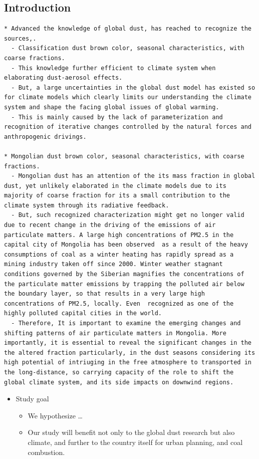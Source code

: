\documentclass[
  11pt,
]{article}
\providecommand{\tightlist}{%
  \setlength{\itemsep}{0pt}\setlength{\parskip}{0pt}}
\begin{document}
\subsection{Introduction}\label{introduction}

\begin{verbatim}
* Advanced the knowledge of global dust, has reached to recognize the sources,.
  - Classification dust brown color, seasonal characteristics, with coarse fractions.
  - This knowledge further efficient to climate system when elaborating dust-aerosol effects.
  - But, a large uncertainties in the global dust model has existed so for climate models which clearly limits our understanding the climate system and shape the facing global issues of global warming.
  - This is mainly caused by the lack of parameterization and recognition of iterative changes controlled by the natural forces and anthropogenic drivings.

* Mongolian dust brown color, seasonal characteristics, with coarse fractions.
  - Mongolian dust has an attention of the its mass fraction in global dust, yet unlikely elaborated in the climate models due to its majority of coarse fraction for its a small contribution to the climate system through its radiative feedback.
  - But, such recognized characterization might get no longer valid due to recent change in the driving of the emissions of air particulate matters. A large high concentrations of PM2.5 in the capital city of Mongolia has been observed  as a result of the heavy consumptions of coal as a winter heating has rapidly spread as a mining industry taken off since 2000. Winter weather stagnant conditions governed by the Siberian magnifies the concentrations of the particulate matter emissions by trapping the polluted air below the boundary layer, so that results in a very large high concentrations of PM2.5, locally. Even  recognized as one of the highly polluted capital cities in the world.
  - Therefore, It is important to examine the emerging changes and shifting patterns of air particulate matters in Mongolia. More importantly, it is essential to reveal the significant changes in the the altered fraction particularly, in the dust seasons considering its high potential of intriuging in the free atmosphere to transported in the long-distance, so carrying capacity of the role to shift the global climate system, and its side impacts on downwind regions.
\end{verbatim}

\begin{itemize}
\tightlist
\item
  Study goal

  \begin{itemize}
  \tightlist
  \item
    We hypothesize \ldots{}
  \item
    Our study will benefit not only to the global dust research but also
    climate, and further to the country itself for urban planning, and
    coal combustion.
  \end{itemize}
\end{itemize}
\end{document}
